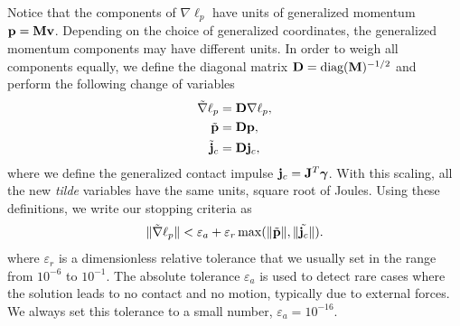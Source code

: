 Notice that the components of $\nabla\ell_p$ have units of generalized momentum
${\mathbf{p}}={\mathbf{M}}{\mathbf{v}}$. Depending on the choice of generalized coordinates, the
generalized momentum components may have different units. In order to weigh all
components equally, we define the diagonal matrix ${\mathbf{D}} =
\text{diag}({\mathbf{M}})^{-1/2}$ and perform the following change of variables
\begin{align}
	\tilde{\nabla}\ell_p &= \mf{D}\nabla\ell_p, \nonumber\\
	\tilde{\mf{p}} &= \mf{D}\mf{p}, \nonumber \\
	\tilde{\mf{j}}_c &= \mf{D}\mf{j}_c,
	\label{eq:scaled_momentum_quantities}
\end{align}
where we define the generalized contact impulse ${\mathbf{j}}_c={\mathbf{J}}^T{\bm\gamma}$.
With this scaling, all the new \emph{tilde} variables have the same units,
square root of Joules. Using these definitions, we write our stopping criteria
as
\begin{equation}
	\Vert\tilde{\nabla}\ell_p\Vert < \varepsilon_a + \varepsilon_r\max(\Vert\tilde{\mf{p}}\Vert,\Vert\tilde{\mf{j}_c}\Vert).
	\label{eq:stopping_criteria}
\end{equation}
where $\varepsilon_r$ is a dimensionless relative tolerance that we usually set
in the range from $10^{-6}$ to $10^{-1}$. The absolute tolerance $\varepsilon_a$
is used to detect rare cases where the solution leads to no contact and no
motion, typically due to external forces. We always set this tolerance to a
small number, $\varepsilon_a=10^{-16}$.

